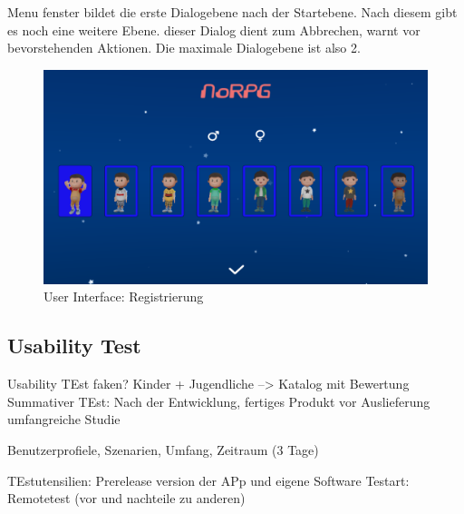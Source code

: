 		Menu fenster bildet die erste Dialogebene nach der Startebene. Nach diesem gibt es noch eine weitere Ebene. dieser Dialog dient zum Abbrechen, warnt vor bevorstehenden Aktionen. Die maximale Dialogebene ist also 2. 

		\begin{figure}[htbp]
			\centering 
			\label{RegisterUI}
			\includegraphics[width=13cm]{pics/RegisterUI.png}
			\caption{User Interface: Registrierung}
		\end{figure}

	
	\subsection{Usability Test}
		Usability TEst faken? Kinder + Jugendliche --> Katalog mit Bewertung
		Summativer TEst: Nach der Entwicklung, fertiges Produkt vor Auslieferung umfangreiche Studie
	
		Benutzerprofiele, Szenarien, Umfang, Zeitraum (3 Tage) 
	
		TEstutensilien: Prerelease version der APp und eigene Software
		Testart: Remotetest (vor und nachteile zu anderen)